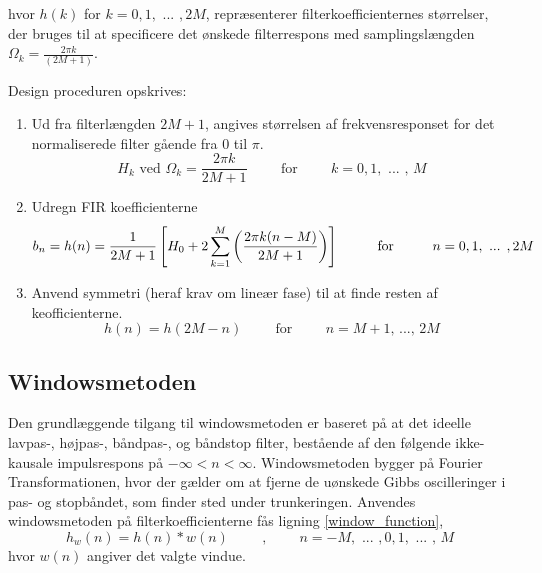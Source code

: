 hvor $h(k)$ for $k=0,1,\text{ ... },2M$, repræsenterer filterkoefficienternes størrelser, der bruges til at specificere det ønskede filterrespons med samplingslængden $\Omega_{k}=\frac{2\pi k}{(2M+1)}$.

Design proceduren opskrives:
\\
\begin{enumerate}
\item Ud fra filterlængden $2M+1$, angives størrelsen af frekvensresponset for det normaliserede filter gående fra $0$ til $\pi$.
\begin{equation}
	H_k \text{ ved } \Omega_{k} = \frac{2 \pi k}{2M+1} \hspace{1cm} \text{for} \hspace{1cm} k=0,1,\text{ ... , } M
\end{equation}
\item Udregn FIR koefficienterne
\begin{equation}
b_n = h(n)=\frac{1}{2M+1}\left[ H_{0}+2\sum_{k=1}^{M} \left( \frac{2\pi k(n-M)}{2M+1} \right) \right] \hspace{1cm} \text{for} \hspace{1 cm} n=0,1,\text{ ... },2M
\end{equation}
\item Anvend symmetri (heraf krav om lineær fase) til at finde resten af keofficienterne.
\begin{equation}
	h(n) = h(2M-n) \hspace{1cm} \text{for} \hspace{1cm} n=M+1 \text{, ..., } 2M
\end{equation}
\end{enumerate}

\subsection{Windowsmetoden}
Den grundlæggende tilgang til windowsmetoden er baseret på at det ideelle lavpas-, højpas-, båndpas-, og båndstop filter, bestående af den følgende ikke-kausale impulsrespons på $-\infty < n < \infty$. Windowsmetoden bygger på Fourier Transformationen, hvor der gælder om at fjerne de uønskede Gibbs oscilleringer i pas- og stopbåndet, som finder sted under trunkeringen. Anvendes windowsmetoden på filterkoefficienterne fås ligning \ref{window_function},
\begin{equation}
	h_w(n) = h(n)*w(n) \hspace{1cm}\text{,} \hspace{1cm}n=-M,\text{ ... },0, 1,\text{ ... , }M	
	\label{window_function}
\end{equation}
hvor $w(n)$ angiver det valgte vindue.

